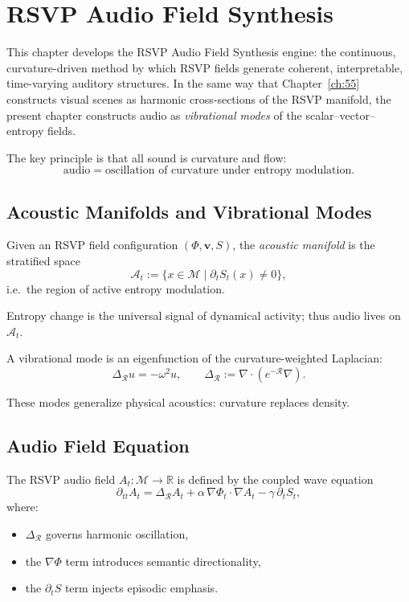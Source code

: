 \chapter{RSVP Audio Field Synthesis}
\label{ch:56}

This chapter develops the RSVP Audio Field Synthesis engine: the continuous,
curvature-driven method by which RSVP fields generate coherent, interpretable,
time-varying auditory structures.  
In the same way that Chapter~\ref{ch:55} constructs visual scenes as harmonic
cross-sections of the RSVP manifold, the present chapter constructs audio as
\emph{vibrational modes} of the scalar--vector--entropy fields.

The key principle is that all sound is curvature and flow:  
\[
\text{audio} = \text{oscillation of curvature under entropy modulation}.
\]

\section{Acoustic Manifolds and Vibrational Modes}
\label{sec:56:manifold}

\begin{definition}
Given an RSVP field configuration $(\Phi,\mathbf{v},S)$, the \emph{acoustic
manifold} is the stratified space
\[
\mathcal{A}_t := \{ x \in \mathcal{M} \mid \partial_t S_t(x) \neq 0 \},
\]
i.e.\ the region of active entropy modulation.
\end{definition}

Entropy change is the universal signal of dynamical activity; thus audio lives
on $\mathcal{A}_t$.

\begin{definition}
A vibrational mode is an eigenfunction of the curvature-weighted Laplacian:
\[
\Delta_{\mathcal{R}} u = -\omega^2 u,
\qquad
\Delta_{\mathcal{R}} := \nabla\cdot ( e^{-\mathcal{R}} \nabla ).
\]
\end{definition}

These modes generalize physical acoustics: curvature replaces density.


\section{Audio Field Equation}
\label{sec:56:wave-equation}

The RSVP audio field $A_t : \mathcal{M} \to \mathbb{R}$ is defined by the
coupled wave equation
\[
\partial_{tt} A_t
= \Delta_{\mathcal{R}} A_t
  + \alpha\,\nabla\Phi_t\cdot\nabla A_t
  - \gamma\,\partial_t S_t,
\]
where:
\begin{itemize}
  \item $\Delta_{\mathcal{R}}$ governs harmonic oscillation,
  \item the $\nabla\Phi$ term introduces semantic directionality,
  \item the $\partial_t S$ term injects episodic emphasis.
\end{itemize}

